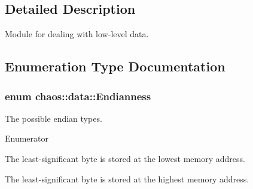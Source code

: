 \subsection{Detailed Description}
Module for dealing with low-\/level data. 

\subsection{Enumeration Type Documentation}
\hypertarget{namespacechaos_1_1data_adb2657d50c0b84cdc1153001031bbf3f}{}
\subsubsection[{Endianness}]{\setlength{\rightskip}{0pt plus 5cm}enum {\bf chaos\+::data\+::\+Endianness}}\label{namespacechaos_1_1data_adb2657d50c0b84cdc1153001031bbf3f}


The possible endian types. 

\begin{Desc}
\item[Enumerator]\par
\begin{description}
\item[{\em 
\hypertarget{namespacechaos_1_1data_adb2657d50c0b84cdc1153001031bbf3fa7fc5455bb6147c278dfa4a84e255c66d}{}E\+N\+D\+I\+A\+N\+\_\+\+L\+I\+T\+T\+L\+E\label{namespacechaos_1_1data_adb2657d50c0b84cdc1153001031bbf3fa7fc5455bb6147c278dfa4a84e255c66d}
}]The least-\/significant byte is stored at the lowest memory address. \item[{\em 
\hypertarget{namespacechaos_1_1data_adb2657d50c0b84cdc1153001031bbf3fa0e1ed99b965cedefe24534be309738ad}{}E\+N\+D\+I\+A\+N\+\_\+\+B\+I\+G\label{namespacechaos_1_1data_adb2657d50c0b84cdc1153001031bbf3fa0e1ed99b965cedefe24534be309738ad}
}]The least-\/significant byte is stored at the highest memory address. \end{description}
\end{Desc}
